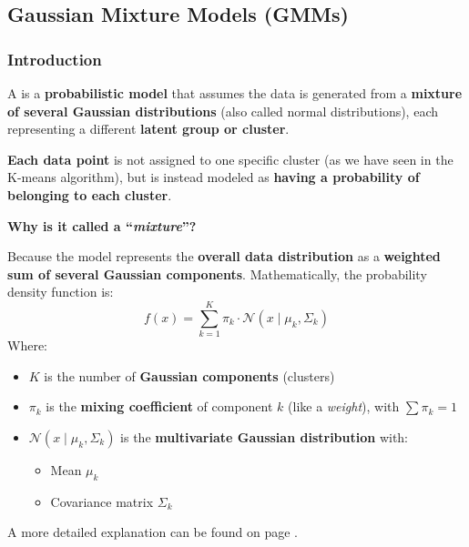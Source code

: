 \subsection{Gaussian Mixture Models (GMMs)}

\subsubsection{Introduction}

A  is a \textbf{probabilistic model} that assumes the data is generated from a \textbf{mixture of several Gaussian distributions} (also called normal distributions), each representing a different \textbf{latent group or cluster}.

\highspace
\textbf{Each data point} is not assigned to one specific cluster (as we have seen in the K-means algorithm), but is instead modeled as \textbf{having a probability of belonging to each cluster}.

\highspace
\begin{flushleft}
    \textcolor{Green3}{ \textbf{Why is it called a ``\emph{mixture}''?}}
\end{flushleft}
Because the model represents the \textbf{overall data distribution} as a \textbf{weighted sum of several Gaussian components}. Mathematically, the probability density function is:
\begin{equation*}
    f\left(x\right) = \displaystyle\sum_{k=1}^{K} \pi_{k} \cdot \mathcal{N}\left(x \mid \mu_{k}, \Sigma_{k}\right)
\end{equation*}
Where:
\begin{itemize}
    \item $K$ is the number of \textbf{Gaussian components} (clusters)
    \item $\pi_{k}$ is the \textbf{mixing coefficient} of component $k$ (like a \emph{weight}), with $\displaystyle\sum \pi_{k} = 1$
    \item $\mathcal{N}\left(x \mid \mu_{k}, \Sigma_{k}\right)$ is the \textbf{multivariate Gaussian distribution} with:
    \begin{itemize}
        \item Mean $\mu_{k}$
        \item Covariance matrix $\Sigma_{k}$
    \end{itemize}
\end{itemize}
A more detailed explanation can be found on page \pageref{subsubsection: Mathematical Foundation}.

